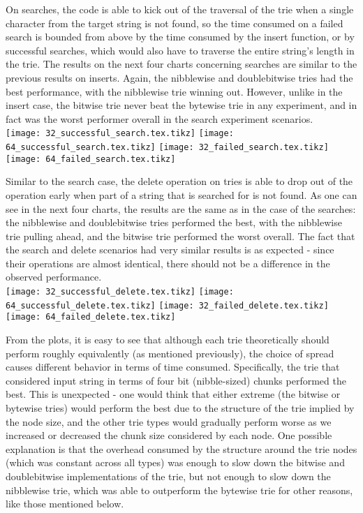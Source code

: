 \documentclass{llncs}
\begin{document}
\newpage
On searches, the code is able to kick out of the traversal of the trie when a single character from the target string is not found, so the time consumed on a failed search is bounded from above by the time consumed by the insert function, or by successful searches, which would also have to traverse the entire string's length in the trie. The results on the next four charts concerning searches are similar to the previous results on inserts. Again, the nibblewise and doublebitwise tries had the best performance, with the nibblewise trie winning out. However, unlike in the insert case, the bitwise trie never beat the bytewise trie in any experiment, and in fact was the worst performer overall in the search experiment scenarios.\\
\texttt{[image: 32\_successful\_search.tex.tikz]}
\texttt{[image: 64\_successful\_search.tex.tikz]}
\texttt{[image: 32\_failed\_search.tex.tikz]}
\texttt{[image: 64\_failed\_search.tex.tikz]}

\newpage
Similar to the search case, the delete operation on tries is able to drop out of the operation early when part of a string that is searched for is not found. As one can see in the next four charts, the results are the same as in the case of the searches: the nibblewise and doublebitwise tries performed the best, with the nibblewise trie pulling ahead, and the bitwise trie performed the worst overall. The fact that the search and delete scenarios had very similar results is as expected - since their operations are almost identical, there should not be a difference in the observed performance.\\
\texttt{[image: 32\_successful\_delete.tex.tikz]}
\texttt{[image: 64\_successful\_delete.tex.tikz]}
\texttt{[image: 32\_failed\_delete.tex.tikz]}
\texttt{[image: 64\_failed\_delete.tex.tikz]}

\newpage
From the plots, it is easy to see that although each trie theoretically should perform roughly equivalently (as mentioned previously), the choice of spread causes different behavior in terms of time consumed. Specifically, the trie that considered input string in terms of four bit (nibble-sized) chunks performed the best. This is unexpected - one would think that either extreme (the bitwise or bytewise tries) would perform the best due to the structure of the trie implied by the node size, and the other trie types would gradually perform worse as we increased or decreased the chunk size considered by each node. One possible explanation is that the overhead consumed by the structure around the trie nodes (which was constant across all types) was enough to slow down the bitwise and doublebitwise implementations of the trie, but not enough to slow down the nibblewise trie, which was able to outperform the bytewise trie for other reasons, like those mentioned below.\\
\end{document}
